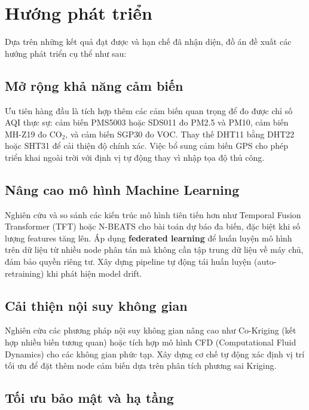 \section{Hướng phát triển}
\label{sec:conclusion:future}

Dựa trên những kết quả đạt được và hạn chế đã nhận diện, đồ án
đề xuất các hướng phát triển cụ thể như sau:

\subsection{Mở rộng khả năng cảm biến}
\label{subsec:future:sensor}

Ưu tiên hàng đầu là tích hợp thêm các cảm biến quan trọng để đo
được chỉ số AQI thực sự: cảm biến PMS5003 hoặc SDS011 đo PM2.5
và PM10, cảm biến MH-Z19 đo CO$_2$, và cảm biến SGP30 đo VOC.
Thay thế DHT11 bằng DHT22 hoặc SHT31 để cải thiện độ chính xác.
Việc bổ sung cảm biến GPS cho phép triển khai ngoài trời với
định vị tự động thay vì nhập tọa độ thủ công.

\subsection{Nâng cao mô hình Machine Learning}
\label{subsec:future:ml}

Nghiên cứu và so sánh các kiến trúc mô hình tiên tiến hơn như
Temporal Fusion Transformer (TFT) hoặc N-BEATS cho bài toán dự báo
đa biến, đặc biệt khi số lượng features tăng lên. Áp dụng
\textbf{federated learning} để huấn luyện mô hình trên dữ liệu từ
nhiều node phân tán mà không cần tập trung dữ liệu về máy chủ,
đảm bảo quyền riêng tư. Xây dựng pipeline tự động tái huấn luyện
(auto-retraining) khi phát hiện model drift.

\subsection{Cải thiện nội suy không gian}
\label{subsec:future:spatial}

Nghiên cứu các phương pháp nội suy không gian nâng cao như
Co-Kriging (kết hợp nhiều biến tương quan) hoặc tích hợp mô hình
CFD (Computational Fluid Dynamics) cho các không gian phức tạp.
Xây dựng cơ chế tự động xác định vị trí tối ưu để đặt thêm node
cảm biến dựa trên phân tích phương sai Kriging.

\subsection{Tối ưu bảo mật và hạ tầng}
\label{subsec:future:infra}

